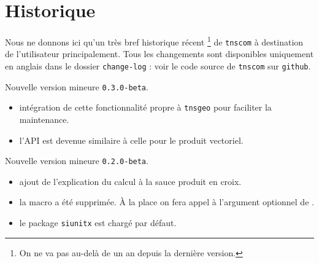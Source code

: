 \documentclass[12pt,a4paper]{article}
\begin{document}
\newpage

\section{Historique}

Nous ne donnons ici qu'un très bref historique récent
\footnote{
	On ne va pas au-delà de un an depuis la dernière version.
}
de \verb+tnscom+ à destination de l'utilisateur principalement.
Tous les changements sont disponibles uniquement en anglais dans le dossier \verb+change-log+ : voir le code source de \verb+tnscom+ sur \verb+github+.

\begin{description}

    \medskip
    \item[2020-07-30] Nouvelle version mineure \verb+0.3.0-beta+.
    
    \begin{itemize}[itemsep=.5em]
        \item {} intégration de cette fonctionnalité propre à \verb#tnsgeo#  pour faciliter la maintenance.
        
         \item {} l'API est devenue similaire à celle pour le produit vectoriel.
    \end{itemize}
    
    \separation


    \medskip
    \item[2020-07-29] Nouvelle version mineure \verb+0.2.0-beta+.
    
    \begin{itemize}[itemsep=.5em]
        \item {} ajout de l'explication du calcul à la sauce produit en croix.
    
    
        \item {} la macro  a été supprimée. À la place on fera appel à l'argument optionnel de .
    
    
        \item {} le package \verb#siunitx# est chargé par défaut.
    \end{itemize}
    
    \separation



\end{description}
\end{document}

